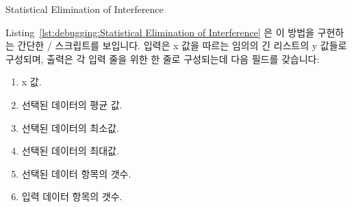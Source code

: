 \begin{listing}[tb]

\caption{Statistical Elimination of Interference}
\label{lst:debugging:Statistical Elimination of Interference}
\end{listing}

Listing~\ref{lst:debugging:Statistical Elimination of Interference}
은 이 방법을 구현하는 간단한 / 스크립트를 보입니다.
입력은 x 값을 따르는 임의의 긴 리스트의 y 값들로 구성되며, 출력은 각 입력 줄을
위한 한 줄로 구성되는데 다음 필드를 갖습니다:

\begin{enumerate}
\item	x 값.
\item	선택된 데이터의 평균 값.
\item	선택된 데이터의 최소값.
\item	선택된 데이터의 최대값.
\item	선택된 데이터 항목의 갯수.
\item	입력 데이터 항목의 갯수.
\end{enumerate}


